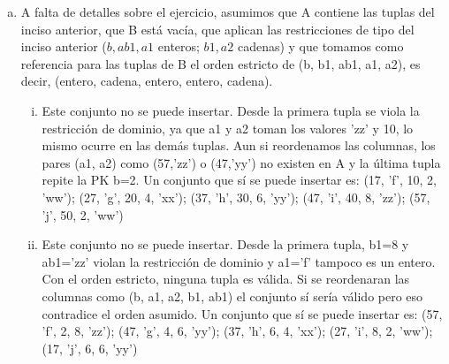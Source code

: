\begin{enumerate}[a.]
\begin{enumerate}[i.]
  \item Con este formato ninguna tupla es válida: a1 no existe en A, b no existe en B y ab1 viola la restricción de dominio (cadena en vez de entero). Tomando las cadenas de letras como la tupla correspondiente de A podemos construir fácilmente el conjunto: (8, 'zz', 17, 77); (6, 'yy', 27, 78); (4, 'xx', 37, 79); (2, 'ww', 47, 80); (8, 'zz', 57, 81)

  \item Podemos ver que los pares (2, 'a'), (4, 'b'), (6, 'c') y (8, 'd') no corresponden a ningun (a1, a2) en A por lo que las tuplas no son válidas. Podemos tomar el mismo conjunto de tuplas y sólo reemplazar a3 por a2 para obtener: (2, 'ww', 17, 23); (4, 'xx', 27, 24); (6, 'yy', 37, 25); (8, 'zz', 47, 26); (2, 'ww', 57, 27)

  \item Finalmente tenemos ¡un conjunto válido! Todas las (a1, a2) existen en A al igual que todas las b en B. Finalmente, todas las PKs son distintas.
  \end{enumerate}

\item A falta de detalles sobre el ejercicio, asumimos que A contiene las tuplas del inciso anterior, que B está vacía, que aplican las restricciones de tipo del inciso anterior ($b, ab1, a1$ enteros; $b1, a2$ cadenas) y que tomamos como referencia para las tuplas de B el orden estricto de (b, b1, ab1, a1, a2), es decir, (entero, cadena, entero, entero, cadena).

  \begin{enumerate}[i.]
  \item Este conjunto no se puede insertar. Desde la primera tupla se viola la restricción de dominio, ya que a1 y a2 toman los valores 'zz' y 10, lo mismo ocurre en las demás tuplas. Aun si reordenamos las columnas, los pares (a1, a2) como (57,'zz') o (47,'yy') no existen en A y la última tupla repite la PK b=2. Un conjunto que sí se puede insertar es: (17, 'f', 10, 2, 'ww'); (27, 'g', 20, 4, 'xx'); (37, 'h', 30, 6, 'yy'); (47, 'i', 40, 8, 'zz'); (57, 'j', 50, 2, 'ww')

  \item Este conjunto no se puede insertar. Desde la primera tupla, b1=8 y ab1='zz' violan la restricción de dominio  y a1='f' tampoco es un entero. Con el orden estricto, ninguna tupla es válida. Si se reordenaran las columnas como (b, a1, a2, b1, ab1) el conjunto sí sería válido pero eso contradice el orden asumido. Un conjunto que sí se puede insertar es: (57, 'f', 2, 8, 'zz'); (47, 'g', 4, 6, 'yy'); (37, 'h', 6, 4, 'xx'); (27, 'i', 8, 2, 'ww'); (17, 'j', 6, 6, 'yy')


\end{enumerate}
\end{enumerate}
